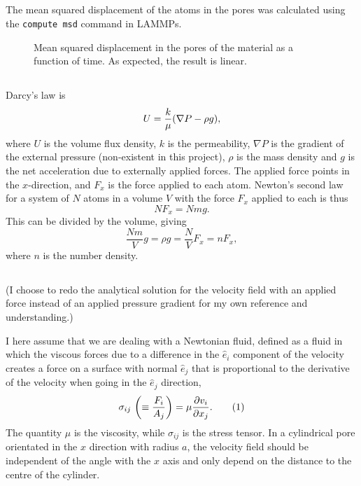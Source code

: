 \documentclass[11pt,british,a4paper]{report}
\newcommand{\eqtag}[1]{\refstepcounter{equation}\tag{\theequation}\label{#1}}
\begin{document}
\subsection{}
The mean squared displacement of the atoms in the pores was calculated using the \texttt{compute msd} command in LAMMPs.
\begin{figure}[tbh]
    \centering
    \caption{Mean squared displacement in the pores of the material as a function of time. As expected, the result is linear.}%
    \label{fig:msdpores}
\end{figure}

\subsection{}
Darcy's law is
\[
    U = \frac{k}{\mu}\qty(\nabla P - \rho g),
\]
where \(U\) is the volume flux density, \(k\) is the permeability, \(\nabla P\) is the gradient of the external pressure (non-existent in this project), \(\rho\) is the mass density and \(g\) is the net acceleration due to externally applied forces. The applied force points in the \(x\)-direction, and \(F_x\) is the force applied to each atom. Newton's second law for a system of \(N\) atoms in a volume \(V\) with the force \(F_x\) applied to each is thus
\[
    NF_x = Nmg.
\]
This can be divided by the volume, giving
\[
    \frac{Nm}{V}g = \rho g = \frac{N}{V}F_x = nF_x,
\]
where \(n\) is the number density.

\subsection{}
(I choose to redo the analytical solution for the velocity field with an applied force instead of an applied pressure gradient for my own reference and understanding.)

I here assume that we are dealing with a Newtonian fluid, defined as a fluid in which the viscous forces due to a difference in the \(\hat{e}_i\) component of the velocity creates a force on a surface with normal \(\hat{e}_j\) that is proportional to the derivative of the velocity when going in the \(\hat{e}_j\) direction,
\[
    \sigma_{ij}\ \qty(\equiv \frac{F_i}{A_j}) = \mu \pdv{v_i}{x_j}.\eqtag{eq:newtfluid}
\]
The quantity \(\mu\) is the viscosity, while \(\sigma_{ij}\) is the stress tensor. In a cylindrical pore orientated in the \(x\) direction with radius \(a\), the velocity field should be independent of the angle with the \(x\) axis and only depend on the distance to the centre of the cylinder.
\end{document}
